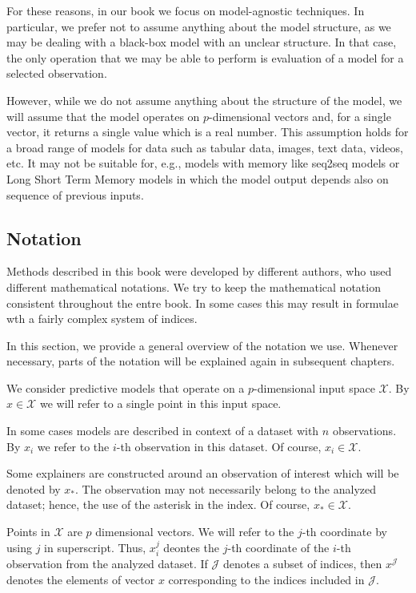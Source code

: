 \documentclass[12pt,]{krantz}
\theoremstyle{definition}
\theoremstyle{definition}
\theoremstyle{definition}
\theoremstyle{remark}
\begin{document}
For these reasons, in our book we focus on model-agnostic techniques. In
particular, we prefer not to assume anything about the model structure,
as we may be dealing with a black-box model with an unclear structure.
In that case, the only operation that we may be able to perform is
evaluation of a model for a selected observation.

However, while we do not assume anything about the structure of the
model, we will assume that the model operates on \(p\)-dimensional
vectors and, for a single vector, it returns a single value which is a
real number. This assumption holds for a broad range of models for data
such as tabular data, images, text data, videos, etc. It may not be
suitable for, e.g., models with memory like seq2seq models
\citep{seq2seq} or Long Short Term Memory models \citep{lstm} in which
the model output depends also on sequence of previous inputs.

\hypertarget{notation}{%
\subsection{Notation}\label{notation}}

Methods described in this book were developed by different authors, who
used different mathematical notations. We try to keep the mathematical
notation consistent throughout the entre book. In some cases this may
result in formulae wth a fairly complex system of indices.

In this section, we provide a general overview of the notation we use.
Whenever necessary, parts of the notation will be explained again in
subsequent chapters.

We consider predictive models that operate on a \(p\)-dimensional input
space \(\mathcal X\). By \(x \in \mathcal X\) we will refer to a single
point in this input space.

In some cases models are described in context of a dataset with \(n\)
observations. By \(x_i\) we refer to the \(i\)-th observation in this
dataset. Of course, \(x_i \in \mathcal X\).

Some explainers are constructed around an observation of interest which
will be denoted by \(x_{*}\). The observation may not necessarily belong
to the analyzed dataset; hence, the use of the asterisk in the index. Of
course, \(x_* \in \mathcal X\).

Points in \(\mathcal X\) are \(p\) dimensional vectors. We will refer to
the \(j\)-th coordinate by using \(j\) in superscript. Thus, \(x^j_i\)
deontes the \(j\)-th coordinate of the \(i\)-th observation from the
analyzed dataset. If \(\mathcal J\) denotes a subset of indices, then
\(x^{\mathcal J}\) denotes the elements of vector \(x\) corresponding to
the indices included in \(\mathcal J\).
\end{document}
